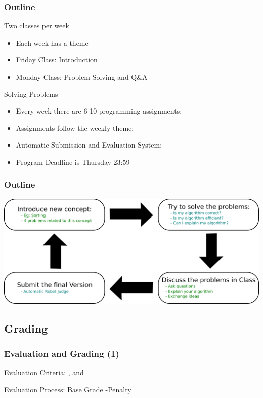 \documentclass{beamer}
\begin{document}
\begin{frame}
    \frametitle{Outline}
    
    \begin{block}{Two classes per week}
        \begin{itemize}   
        \item Each week has a theme
        \item Friday Class: Introduction
        \item Monday Class: Problem Solving and Q\&A
        \end{itemize}
    \end{block}
    
    \begin{block}{Solving Problems}
        \begin{itemize}
        \item Every week there are 6-10 programming assignments;
        \item Assignments follow the weekly theme;
        \item Automatic Submission and Evaluation System;
        \item Program Deadline is Thursday 23:59
        \end{itemize}
    \end{block}
\end{frame}
    
\begin{frame}
  \frametitle{Outline}
  \begin{center}
    \includegraphics[width=1\textwidth]{../img/classoutline}
  \end{center}
\end{frame}

\subsection{Grading}

\begin{frame}
  \frametitle{Evaluation and Grading (1)}

  Evaluation Criteria: , 
  and 
  
  \bigskip

  Evaluation Process: Base Grade  \alert{-Penalty}
\end{frame}
\end{document}
